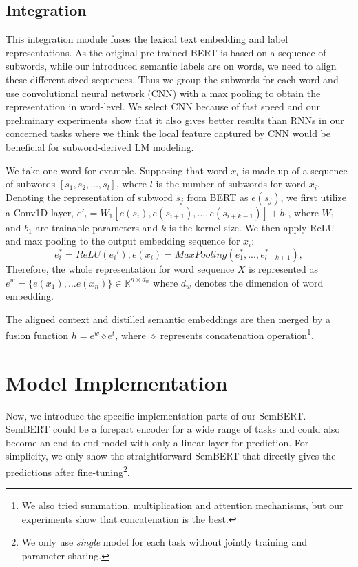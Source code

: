\documentclass[letterpaper]{article} \usepackage{aaai20}  \usepackage{times}  \usepackage{helvet} \usepackage{courier}  \usepackage[hyphens]{url}  \usepackage{graphicx} \urlstyle{rm} \def\UrlFont{\rm}  \usepackage{graphicx}  \frenchspacing  \usepackage{amssymb}
\begin{document}
\subsection{Integration} 

This integration module fuses the lexical text embedding and label representations. As the original pre-trained BERT is based on a sequence of subwords, while our introduced semantic labels are on words, we need to align these different sized sequences. Thus we group the subwords for each word and use convolutional neural network (CNN) with a max pooling to obtain the representation in word-level. We select CNN because of fast speed and our preliminary experiments show that it also gives better results than RNNs in our concerned tasks where we think the local feature captured by CNN would be beneficial for subword-derived LM modeling. 

We take one word for example. Supposing that word $x_i$ is made up of a sequence of subwords $[s_1, s_2, ..., s_l]$, where $l$ is the number of subwords for word $x_i$. Denoting the representation of subword $s_j$ from BERT as $e(s_{j})$, we first utilize a Conv1D layer, $e{'_i} = W_1\left[e(s_i), e(s_{i+1}), \dots, e(s_{i+k-1})\right] + b_1$,
where $W_1$ and $b_1$ are trainable parameters and $k$ is the kernel size. We then apply ReLU and max pooling to the output embedding sequence for $x_i$:
\begin{equation}
e_i^* = ReLU(e_i'), e(x_i) = MaxPooling({e_1^*,...,e_{l-k+1}^*}),
\end{equation}
Therefore, the whole representation for word sequence $X$ is represented as $e^w =\{e(x_1), \dots e(x_n)\} \in \mathbb{R}^{n \times d_w}$ where $d_w$ denotes the dimension of word embedding.

The aligned context and distilled semantic embeddings are then merged by a fusion function $h = e^w \diamond e^t$, where $\diamond$ represents concatenation operation\footnote{We also tried summation, multiplication and attention mechanisms, but our experiments show that concatenation is the best.}.

\section{Model Implementation}\label{sec:imp}
Now, we introduce the specific implementation parts of our SemBERT. SemBERT could be a forepart encoder for a wide range of tasks and could also become an end-to-end model with only a linear layer for prediction. For simplicity, we only show the straightforward SemBERT that directly gives the predictions after fine-tuning\footnote{We only use \emph{single} model for each task without jointly training and parameter sharing.}. 
\end{document}
